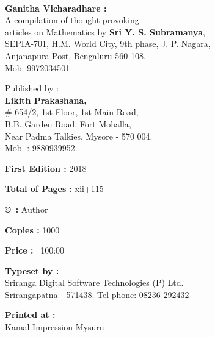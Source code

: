 ~
\thispagestyle{empty}

\begin{center}
{\rm {\bfseries Ganitha Vicharadhare :} \\
A compilation of thought provoking\\
 articles on Mathematics by {\bfseries Sri Y. S. Subramanya},\\
  SEPIA-701, H.M. World City, 9th phase, J. P. Nagara,\\
   Anjanapura Post, Bengaluru 560 108.\\
   Mob: 9972034501}
   \end{center}

\begin{center}
 {\rm Published by :\\
  {\bfseries Likith Prakashana,} \\
   \# 654/2, 1st Floor, 1st Main Road,\\
    B.B. Garden Road, Fort Mohalla, \\
    Near Padma Talkies, Mysore - 570 004.\\
     Mob. : 9880939952.}
     \end{center}

\vfill

\begin{center}
{\rm {\bfseries First Edition :} 2018}

\vfill

{\rm {\bfseries Total of Pages :} xii+115}

\vfill

{\rm {\bfseries \copyright ~:} Author}

\vfill

{\rm {\bfseries Copies :} 1000}

\vfill

{\rm {\bfseries Price :}  \rupee\ 100:00}



\vfill


\begin{center}
{\rm {\bfseries Typeset by :}\\
 Sriranga Digital Software Technologies (P) Ltd.\\
 Srirangapatna - 571438. Tel phone: 08236 292432}
\end{center}


\vfill


{\rm {\bfseries Printed at :}\\
 Kamal Impression Mysuru}
\end{center}
\vfill\eject
